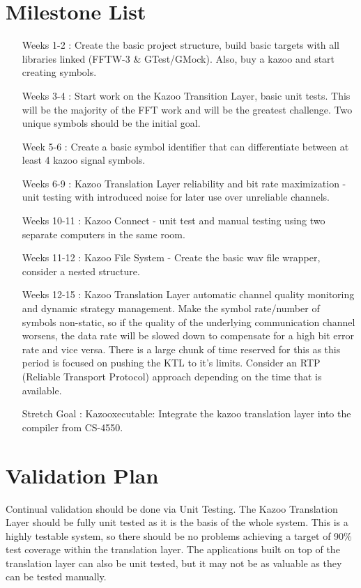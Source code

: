 \documentclass[]{article}
\begin{document}
\section{Milestone List}

\begin{itemize}
  \item[Weeks 1-2]: Create the basic project structure, build basic targets with all libraries linked (FFTW-3 \& GTest/GMock). Also, buy a kazoo and start creating symbols.
  \item[Weeks 3-4]: Start work on the Kazoo Transition Layer, basic unit tests. This will be the majority of the FFT work and will be the greatest challenge. Two unique symbols should be the initial goal.
  \item[Week 5-6]: Create a basic symbol identifier that can differentiate between at least 4 kazoo signal symbols.
  \item[Weeks 6-9]: Kazoo Translation Layer reliability and bit rate maximization - unit testing with introduced noise for later use over unreliable channels.
  \item[Weeks 10-11]: Kazoo Connect - unit test and manual testing using two separate computers in the same room.
  \item[Weeks 11-12]: Kazoo File System - Create the basic wav file wrapper, consider a nested structure.
  \item[Weeks 12-15]: Kazoo Translation Layer automatic channel quality monitoring and dynamic strategy management. Make the symbol rate/number of symbols non-static, so if the quality of the underlying communication channel worsens, the data rate will be slowed down to compensate for a high bit error rate and vice versa. There is a large chunk of time reserved for this as this period is focused on pushing the KTL to it's limits. Consider an RTP (Reliable Transport Protocol) approach depending on the time that is available.
  \item[Stretch Goal]: Kazooxecutable: Integrate the kazoo translation layer into the compiler from CS-4550.
\end{itemize}

\section{Validation Plan}

Continual validation should be done via Unit Testing. The Kazoo Translation Layer should be fully unit tested as it is the basis of the whole system. This is a highly testable system, so there should be no problems achieving a target of 90\% test coverage within the translation layer. The applications built on top of the translation layer can also be unit tested, but it may not be as valuable as they can be tested manually.
\end{document}
